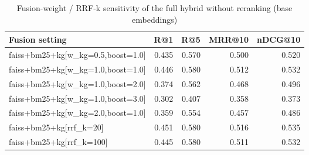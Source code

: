 \begin{table}
\caption{Fusion-weight / RRF-k sensitivity of the full hybrid without reranking (base embeddings)}
\label{tab:sweep_base}
\begin{tabular}{lrrrr}
\toprule
Fusion setting & R@1 & R@5 & MRR@10 & nDCG@10 \\
\midrule
faiss+bm25+kg[w\_kg=0.5,boost=1.0] & 0.435 & 0.570 & 0.500 & 0.520 \\
faiss+bm25+kg[w\_kg=1.0,boost=1.0] & 0.446 & 0.580 & 0.512 & 0.532 \\
faiss+bm25+kg[w\_kg=1.0,boost=2.0] & 0.374 & 0.562 & 0.468 & 0.496 \\
faiss+bm25+kg[w\_kg=1.0,boost=3.0] & 0.302 & 0.407 & 0.358 & 0.373 \\
faiss+bm25+kg[w\_kg=2.0,boost=1.0] & 0.359 & 0.554 & 0.457 & 0.486 \\
faiss+bm25+kg[rrf\_k=20] & 0.451 & 0.580 & 0.516 & 0.535 \\
faiss+bm25+kg[rrf\_k=100] & 0.445 & 0.580 & 0.511 & 0.532 \\
\bottomrule
\end{tabular}
\end{table}
